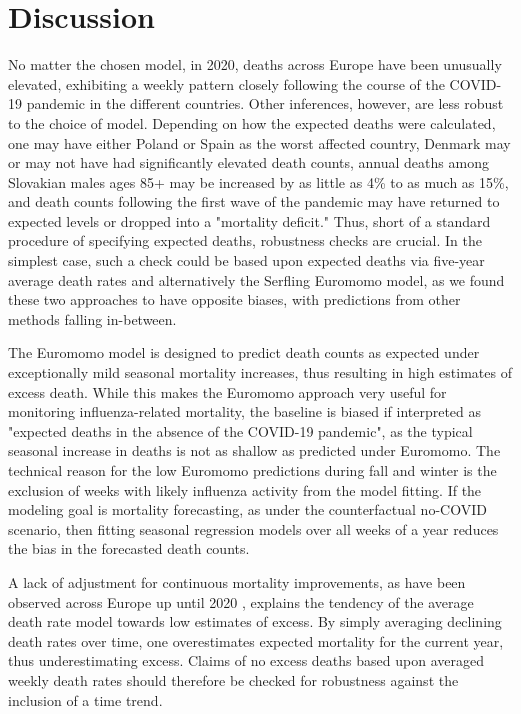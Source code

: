 \documentclass[12pt]{article}
\begin{document}
\section*{Discussion}

No matter the chosen model, in 2020, deaths across Europe have been unusually elevated, exhibiting a weekly pattern closely following the course of the COVID-19 pandemic in the different countries. Other inferences, however, are less robust to the choice of model. Depending on how the expected deaths were calculated, one may have either Poland or Spain as the worst affected country, Denmark may or may not have had significantly elevated death counts, annual deaths among Slovakian males ages 85+ may be increased by as little as 4\% to as much as 15\%, and death counts following the first wave of the pandemic may have returned to expected levels or dropped into a "mortality deficit." Thus, short of a standard procedure of specifying expected deaths, robustness checks are crucial. In the simplest case, such a check could be based upon expected deaths via five-year average death rates and alternatively the Serfling Euromomo model, as we found these two approaches to have opposite biases, with predictions from other methods falling in-between.

The Euromomo model is designed to predict death counts as expected under exceptionally mild seasonal mortality increases, thus resulting in high estimates of excess death. While this makes the Euromomo approach very useful for monitoring influenza-related mortality, the baseline is biased if interpreted as "expected deaths in the absence of the COVID-19 pandemic", as the typical seasonal increase in deaths is not as shallow as predicted under Euromomo. The technical reason for the low Euromomo predictions during fall and winter is the exclusion of weeks with likely influenza activity from the model fitting. If the modeling goal is mortality forecasting, as under the counterfactual no-COVID scenario, then fitting seasonal regression models over all weeks of a year reduces the bias in the forecasted death counts.

A lack of adjustment for continuous mortality improvements, as have been observed across Europe up until 2020 \citep{Leon2011, Aburto2021a}, explains the tendency of the average death rate model towards low estimates of excess. By simply averaging declining death rates over time, one overestimates expected mortality for the current year, thus underestimating excess. Claims of no excess deaths based upon averaged weekly death rates should therefore be checked for robustness against the inclusion of a time trend.
\end{document}
